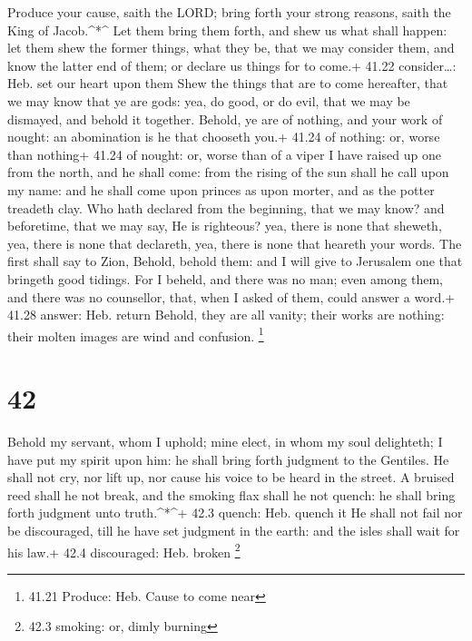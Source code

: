  Produce your cause, saith the LORD; bring forth your
strong reasons, saith the King of Jacob.\^{}*\^{}  Let them
bring them forth, and shew us what shall happen: let them shew the
former things, what they be, that we may consider them, and know the
latter end of them; or declare us things for to come.+ 41.22
consider\ldots: Heb. set our heart upon them  Shew the
things that are to come hereafter, that we may know that ye are gods:
yea, do good, or do evil, that we may be dismayed, and behold it
together.  Behold, ye are of nothing, and your work of
nought: an abomination is he that chooseth you.+ 41.24 of nothing: or,
worse than nothing+ 41.24 of nought: or, worse than of a viper
 I have raised up one from the north, and he shall come:
from the rising of the sun shall he call upon my name: and he shall come
upon princes as upon morter, and as the potter treadeth clay.
 Who hath declared from the beginning, that we may know?
and beforetime, that we may say, He is righteous? yea, there is none
that sheweth, yea, there is none that declareth, yea, there is none that
heareth your words.  The first shall say to Zion, Behold,
behold them: and I will give to Jerusalem one that bringeth good
tidings.  For I beheld, and there was no man; even among
them, and there was no counsellor, that, when I asked of them, could
answer a word.+ 41.28 answer: Heb. return  Behold, they are
all vanity; their works are nothing: their molten images are wind and
confusion. \footnote{41.21 Produce: Heb. Cause to come near}

\hypertarget{section-41}{%
\section{42}\label{section-41}}

 Behold my servant, whom I uphold; mine elect, in whom my
soul delighteth; I have put my spirit upon him: he shall bring forth
judgment to the Gentiles.  He shall not cry, nor lift up,
nor cause his voice to be heard in the street.  A bruised
reed shall he not break, and the smoking flax shall he not quench: he
shall bring forth judgment unto truth.\^{}*\^{}+ 42.3 quench: Heb.
quench it  He shall not fail nor be discouraged, till he
have set judgment in the earth: and the isles shall wait for his law.+
42.4 discouraged: Heb. broken \footnote{42.3 smoking: or, dimly burning}

